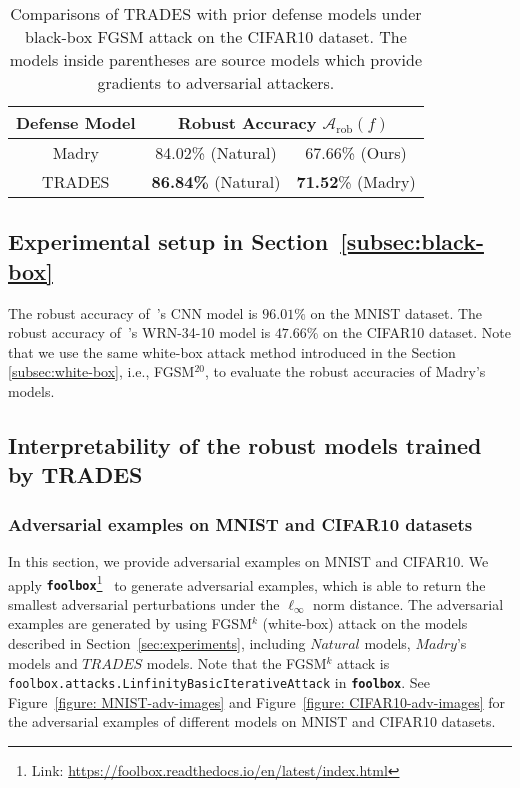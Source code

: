\documentclass[11pt]{article}
\newcommand{\adv}{\mathrm{rob}}
\newcommand{\0}{\mathbf{0}}
\newcommand{\1}{\mathbf{1}}
\newcommand{\cA}{\mathcal{A}}
\begin{document}
\begin{table*}[ht]
	\caption{Comparisons of TRADES with prior defense models under black-box FGSM attack on the CIFAR10 dataset. The models inside parentheses are source models which provide gradients to adversarial attackers.}
	\label{table: CIFAR10 FGSM black-box defense}
	\centering
\begin{tabular}{c||c|c}\hline
Defense Model & \multicolumn{2}{c}{Robust Accuracy $\cA_\adv(f)$}
		\\
		\hline
		{Madry} & 84.02\% (Natural)  & 67.66\% (Ours) \\ 
		\hline
		{TRADES} & \textbf{86.84\%} (Natural) & \textbf{71.52}\% (Madry)  \\
		\hline
\end{tabular}
\end{table*}


\subsection{Experimental setup in Section~\ref{subsec:black-box}}
The robust accuracy of~\cite{madry2018towards}'s CNN model is $96.01\%$ on the MNIST dataset. The robust accuracy of~\cite{madry2018towards}'s WRN-34-10 model is $47.66\%$ on the CIFAR10 dataset. Note that we use the same white-box attack method introduced in the Section \ref{subsec:white-box}, i.e., FGSM$^{20}$,  to evaluate the robust accuracies of Madry's models.

\subsection{Interpretability of the robust models trained by TRADES}

\subsubsection{Adversarial examples on MNIST and CIFAR10 datasets}
In this section, we provide adversarial examples on MNIST and CIFAR10. We apply \textbf{\texttt{foolbox}}\footnote{Link: \url{https://foolbox.readthedocs.io/en/latest/index.html}}~\cite{rauber2017foolbox} to generate adversarial examples, which is able to return the smallest adversarial perturbations under the $\ell_\infty$ norm distance. The adversarial examples are generated by using FGSM$^{k}$ (white-box) attack on the models described in Section~\ref{sec:experiments}, including $\textit{Natural}$ models, $\textit{Madry}$'s models and $\textit{TRADES}$ models. Note that the FGSM$^{k}$ attack is \texttt{foolbox.attacks.LinfinityBasicIterativeAttack} in \textbf{\texttt{foolbox}}. See Figure~\ref{figure: MNIST-adv-images} and Figure~\ref{figure: CIFAR10-adv-images} for the adversarial examples of different models on  MNIST and CIFAR10 datasets.
\end{document}
